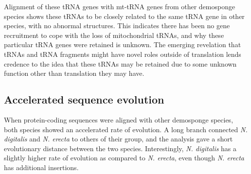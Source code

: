 \documentclass[../main.tex]{subfiles}
\begin{document}
Alignment of these tRNA genes with mt-tRNA genes from other demosponge species shows these tRNAs to be closely related to the same tRNA gene in other species, with no abnormal structures. This indicates there has been no gene recruitment to cope with the loss of mitochondrial tRNAs, and why these particular tRNA genes were retained is unknown. The emerging revelation that tRNAs and tRNA fragments might have novel roles outside of translation lends credence to the idea that these tRNAs may be retained due to some unknown function other than translation they may have.

\subsection{Accelerated sequence evolution}
When protein-coding sequences were aligned with other demosponge species, both species showed an accelerated rate of evolution. A long branch connected \emph{N. digitalis} and \emph{N. erecta} to others of their group, and the analysis gave a short evolutionary distance between the two species. Interestingly, \emph{N. digitalis} has a slightly higher rate of evolution as compared to \emph{N. erecta}, even though \emph{N. erecta} has additional insertions.
\end{document}
